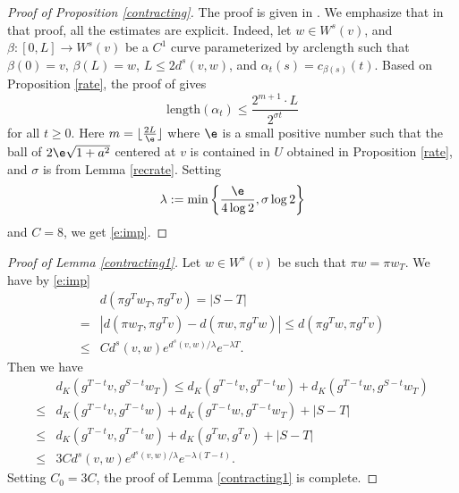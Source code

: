 \documentclass[11pt]{amsart}
\theoremstyle{definition}
\def\a{\alpha}
\def\b{\beta}
\begin{document}
\begin{proof}[Proof of Proposition \ref{contracting}]
The proof is given in \cite[Proposition 3.10]{BBE}. We emphasize that in that proof, all the estimates are explicit. Indeed, let $w\in W^s(v)$, and $\b:[0,L]\to W^s(v)$ be a $C^1$ curve parameterized by arclength such that $\b(0)=v$, $\b(L)=w$, $L\le 2d^s(v,w)$, and $\a_t(s)=c_{\b(s)}(t)$. Based on Proposition \ref{rate}, the proof of \cite[Proposition 3.10]{BBE} gives
$$\text{length}(\a_t)\le \frac{2^{m+1}\cdot L}{2^{\sigma t}}$$
for all $t\ge 0$. Here $m=\lfloor \frac{2L}{\e}\rfloor$ where $\e$ is a small positive number such that the ball of $2\e\sqrt{1+a^2}$ centered at $v$ is contained in $U$ obtained in Proposition \ref{rate}, and $\sigma$ is from Lemma \ref{recrate}.
Setting
$$\lambda:=\min\left\{\frac{\e}{4\log 2}, \sigma \log 2\right\}$$
and $C=8$, we get \eqref{e:imp}.
\end{proof}


\begin{proof}[Proof of Lemma \ref{contracting1}]
Let $w\in W^s(v)$ be such that $\pi w=\pi w_T$. We have by \eqref{e:imp}
\begin{equation*}
\begin{aligned}
&d(\pi g^Tw_T, \pi g^Tv)=|S-T|\\
=&|d(\pi w_T, \pi g^Tv)- d(\pi w, \pi g^Tw)|\le d(\pi g^Tw, \pi g^Tv)\\
\le &Cd^s(v,w)e^{d^s(v,w)/\lambda}e^{-\lambda T}.
\end{aligned}
\end{equation*}
Then we have
\begin{equation*}
\begin{aligned}
&d_K(g^{T-t}v,g^{S-t}w_T) \le d_K( g^{T-t}v,g^{T-t}w)+d_K( g^{T-t}w,g^{S-t}w_T)\\
 \le &d_K( g^{T-t}v, g^{T-t}w)+d_K( g^{T-t}w, g^{T-t}w_T)+|S-T|\\
 \le &d_K(g^{T-t}v, g^{T-t}w)+d_K( g^{T}w, g^{T}v)+|S-T|\\
 \le &3Cd^s(v,w)e^{d^s(v,w)/\lambda}e^{-\lambda (T-t)}.
\end{aligned}
\end{equation*}
Setting $C_0=3C$, the proof of Lemma \ref{contracting1} is complete.
\end{proof}
\end{document}

